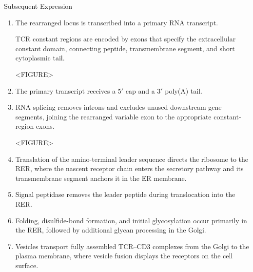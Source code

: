       \begin{core}{Subsequent Expression}

        \begin{enumerate}[label=(\arabic*)]

          \item The rearranged locus is transcribed into a primary RNA transcript.

            TCR constant regions are encoded by exons that specify the extracellular constant domain, connecting peptide, transmembrane segment, and short cytoplasmic tail.

            <FIGURE>

          \item The primary transcript receives a 5$'$ cap and a 3$'$ poly(A) tail.

          \item RNA splicing removes introns and excludes unused downstream gene segments, joining the rearranged variable exon to the appropriate constant-region exons.

            <FIGURE>

          \item Translation of the amino-terminal leader sequence directs the ribosome to the RER, where the nascent receptor chain enters the secretory pathway and its transmembrane segment anchors it in the ER membrane.

          \item Signal peptidase removes the leader peptide during translocation into the RER.

          \item Folding, disulfide-bond formation, and initial glycosylation occur primarily in the RER, followed by additional glycan processing in the Golgi.

          \item Vesicles transport fully assembled TCR--CD3 complexes from the Golgi to the plasma membrane, where vesicle fusion displays the receptors on the cell surface.

        \end{enumerate}

      \end{core}

